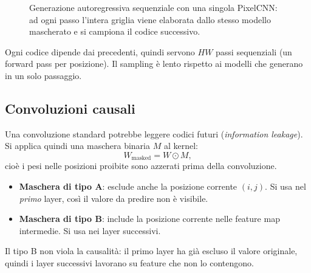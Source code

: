 \documentclass[11pt,a4paper]{article}
\begin{document}
\begin{figure}[H]
{%
}
\caption{Generazione autoregressiva sequenziale con una singola PixelCNN: ad ogni passo l'intera griglia viene elaborata dallo stesso modello mascherato e si campiona il codice successivo.}
\end{figure}

\begin{osservazione}
Ogni codice dipende dai precedenti, quindi servono $HW$ passi sequenziali (un forward pass per posizione).
Il sampling è lento rispetto ai modelli che generano in un solo passaggio.
\end{osservazione}

\subsection{Convoluzioni causali}

Una convoluzione standard potrebbe leggere codici futuri (\emph{information leakage}).
Si applica quindi una maschera binaria $M$ al kernel:
\[
W_{\mathrm{masked}}=W\odot M,
\]
cioè i pesi nelle posizioni proibite sono azzerati prima della convoluzione.

\begin{itemize}
  \item \textbf{Maschera di tipo A}: esclude anche la posizione corrente $(i,j)$. Si usa nel \emph{primo} layer,
  così il valore da predire non è visibile.
  \item \textbf{Maschera di tipo B}: include la posizione corrente nelle feature map intermedie. Si usa nei layer successivi.
\end{itemize}
Il tipo B non viola la causalità: il primo layer ha già escluso il valore originale, quindi i layer successivi
lavorano su feature che non lo contengono.
\end{document}
